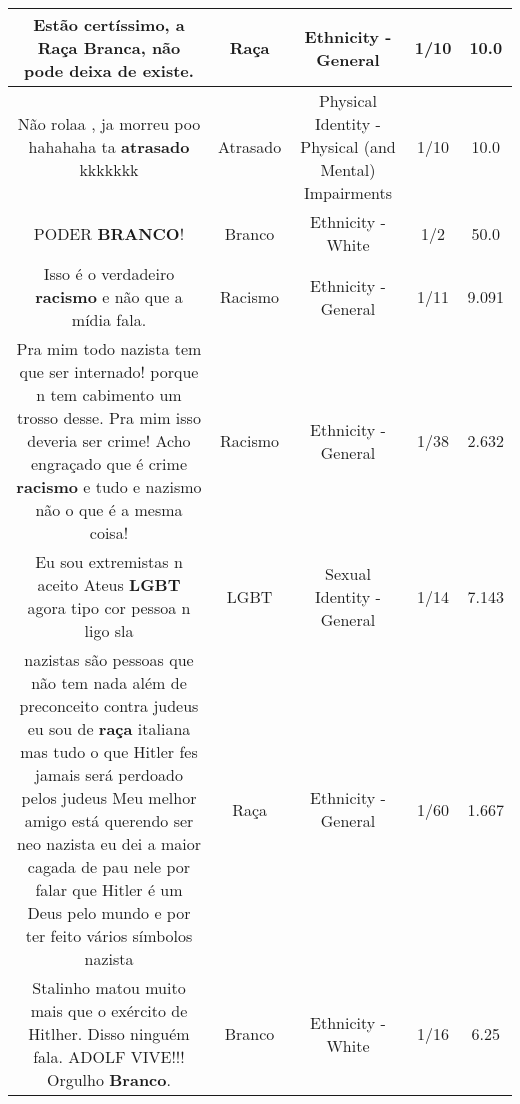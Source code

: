 \documentclass[11pt]{article}
\newlength\mylength
\begin{document}
\begin{center}
\begin{longtable}{|C{.65\mylength}|C{.30\mylength}|C{.12\mylength}|C{.12\mylength}|C{.12\mylength}|}
  \small Estão certíssimo, a \textbf{Raça} Branca, não pode deixa de existe.\normalsize   & Raça & Ethnicity - General & 1/10 & 10.0 \\  \hline
  \small Não rolaa , ja morreu poo hahahaha ta \textbf{atrasado} kkkkkkk\normalsize   & Atrasado & Physical Identity - Physical (and Mental) Impairments & 1/10 & 10.0 \\  \hline
  \small PODER \textbf{BRANCO}!\normalsize   & Branco & Ethnicity - White & 1/2 & 50.0 \\  \hline
  \small Isso é o verdadeiro \textbf{racismo} e não que a mídia fala.\normalsize   & Racismo & Ethnicity - General & 1/11 & 9.091 \\  \hline
  \small Pra mim todo nazista tem que ser internado! porque n tem cabimento um trosso desse. Pra mim isso deveria ser crime! Acho engraçado que é crime \textbf{racismo} e tudo e nazismo não o que é a mesma coisa!\normalsize   & Racismo & Ethnicity - General & 1/38 & 2.632 \\  \hline
  \small Eu sou extremistas n aceito Ateus \textbf{LGBT} agora tipo cor pessoa n ligo sla\normalsize   & LGBT & Sexual Identity - General & 1/14 & 7.143 \\  \hline
  \small nazistas são pessoas que não tem nada além de preconceito contra judeus eu sou de \textbf{raça} italiana mas tudo o que Hitler fes jamais será perdoado pelos judeus Meu melhor amigo está querendo ser neo nazista eu dei a maior cagada de pau nele por falar que Hitler é um Deus pelo mundo e por ter feito vários símbolos nazista\normalsize   & Raça & Ethnicity - General & 1/60 & 1.667 \\  \hline
  \small Stalinho matou muito mais que o exército de Hitlher. Disso ninguém fala.  ADOLF VIVE!!! Orgulho \textbf{Branco}.\normalsize   & Branco & Ethnicity - White & 1/16 & 6.25 \\  \hline

\end{longtable}
\end{center}
\end{document}
